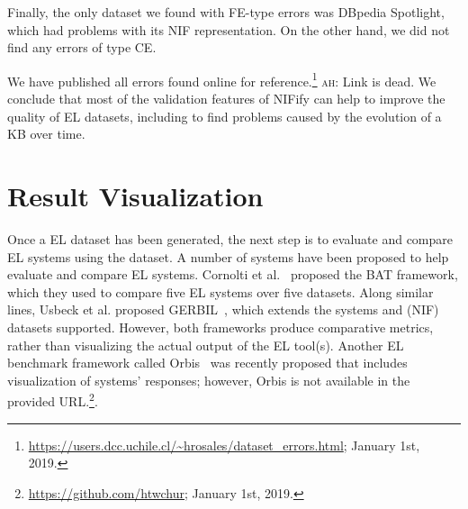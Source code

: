 \documentclass[sigconf]{acmart}
\newcommand{\ah}[1]{{\color{blue}\textsc{ah:} #1}}
\begin{document}
Finally, the only dataset we found with FE-type errors was DBpedia Spotlight, which had problems with its NIF representation. On the other hand, we did not find any errors of type CE.

We have published all errors found online for reference.\footnote{\url{https://users.dcc.uchile.cl/~hrosales/dataset_errors.html}; January 1st, 2019.} \ah{Link is dead.} We conclude that most of the validation features of NIFify can help to improve the quality of EL datasets, including to find problems caused by the evolution of a KB over time. 

\section{Result Visualization}


Once a EL dataset has been generated, the next step is to evaluate and compare EL systems using the dataset. A number of systems have been proposed to help evaluate and compare EL systems. Cornolti et al.~\cite{BAT2013} proposed the BAT framework, which they used to compare five EL systems over five datasets. Along similar lines, Usbeck et al. proposed GERBIL~\cite{gerbil-2015}, which extends the systems and (NIF) datasets supported. However, both frameworks produce comparative metrics, rather than visualizing the actual output of the EL tool(s). Another EL benchmark framework called Orbis~\cite{Orbis2018} was recently proposed that includes visualization of systems' responses; however, Orbis is not available in the provided URL.\footnote{\url{https://github.com/htwchur}; January 1st, 2019.}. 
\end{document}
